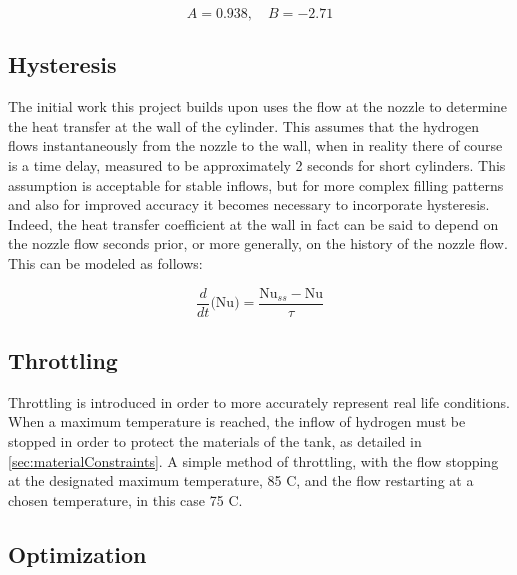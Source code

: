 \begin{equation}
A =  0.938 ,  \quad B = -2.71
\end{equation}


\subsection{Hysteresis}

The initial work this project builds upon uses the flow at the nozzle to determine the heat transfer at the wall of the cylinder. This assumes that the hydrogen flows instantaneously from the nozzle to the wall, when in reality there of course is a time delay, measured to be approximately 2 seconds for short cylinders. This assumption is acceptable for stable inflows, but for more complex filling patterns and also for improved accuracy it becomes necessary to incorporate hysteresis. Indeed, the heat transfer coefficient at the wall in fact can be said to depend on the nozzle flow seconds prior, or more generally, on the history of the nozzle flow. This can be modeled as follows:

\begin{equation}
\frac{d}{dt}\Big(\text{Nu}\Big) = \frac{\text{Nu}_{ss}-\text{Nu}}{\tau}
\end{equation}


\subsection{Throttling}

Throttling is introduced in order to more accurately represent real life conditions. When a maximum temperature is reached, the inflow of hydrogen must be stopped in order to protect the materials of the tank, as detailed in \cref{sec:materialConstraints}. A simple method of throttling, with the flow stopping at the designated maximum temperature, 85 \degree C, and the flow restarting at a chosen temperature, in this case  75 \degree C.


\subsection{Optimization}

